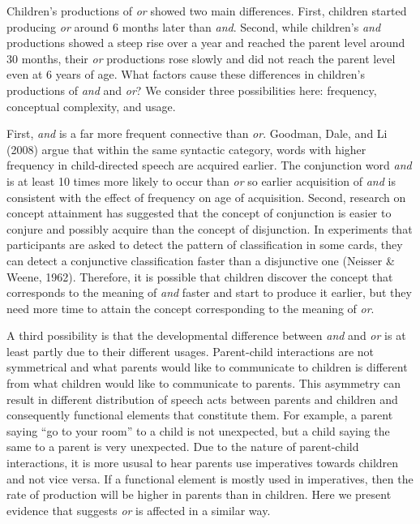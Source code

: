 \documentclass[,man,floatsintext]{apa6}
\begin{document}
Children's productions of \emph{or} showed two main differences. First, children started producing \emph{or} around 6 months later than \emph{and}. Second, while children's \emph{and} productions showed a steep rise over a year and reached the parent level around 30 months, their \emph{or} productions rose slowly and did not reach the parent level even at 6 years of age. What factors cause these differences in children's productions of \emph{and} and \emph{or}? We consider three possibilities here: frequency, conceptual complexity, and usage.

First, \emph{and} is a far more frequent connective than \emph{or}. Goodman, Dale, and Li (2008) argue that within the same syntactic category, words with higher frequency in child-directed speech are acquired earlier. The conjunction word \emph{and} is at least 10 times more likely to occur than \emph{or} so earlier acquisition of \emph{and} is consistent with the effect of frequency on age of acquisition. Second, research on concept attainment has suggested that the concept of conjunction is easier to conjure and possibly acquire than the concept of disjunction. In experiments that participants are asked to detect the pattern of classification in some cards, they can detect a conjunctive classification faster than a disjunctive one (Neisser \& Weene, 1962). Therefore, it is possible that children discover the concept that corresponds to the meaning of \emph{and} faster and start to produce it earlier, but they need more time to attain the concept corresponding to the meaning of \emph{or}.

A third possibility is that the developmental difference between \emph{and} and \emph{or} is at least partly due to their different usages. Parent-child interactions are not symmetrical and what parents would like to communicate to children is different from what children would like to communicate to parents. This asymmetry can result in different distribution of speech acts between parents and children and consequently functional elements that constitute them. For example, a parent saying \enquote{go to your room} to a child is not unexpected, but a child saying the same to a parent is very unexpected. Due to the nature of parent-child interactions, it is more ususal to hear parents use imperatives towards children and not vice versa. If a functional element is mostly used in imperatives, then the rate of production will be higher in parents than in children. Here we present evidence that suggests \emph{or} is affected in a similar way.
\end{document}
